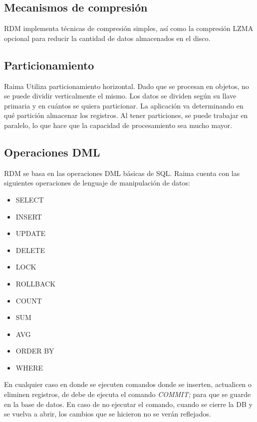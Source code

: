 \documentclass{acmart}
\begin{document}
\subsection{Mecanismos de compresión}
RDM implementa técnicas de compresión simples, así como la compresión LZMA opcional para reducir la cantidad de datos almacenados en el disco. \cite{Rover}
\subsection{Particionamiento}
Raima Utiliza particionamiento horizontal. Dado que se procesan en objetos, no se puede dividir verticalmente el mismo. Los datos se dividen según su llave primaria y en cuántos se quiera particionar. La aplicación va determinando en qué partición almacenar los registros. Al tener particiones, se puede trabajar en paralelo, lo que hace que la capacidad de procesamiento sea mucho mayor.
\subsection{Operaciones DML}
RDM se basa en las operaciones DML básicas de SQL.
Raima cuenta con las siguientes operaciones de lenguaje de manipulación de datos:\par
\begin{itemize}
    \item SELECT\par
	\item INSERT\par
	\item UPDATE\par
	\item DELETE\par
	\item LOCK\par
	\item ROLLBACK\par
	\item COUNT\par
	\item SUM\par
	\item AVG\par
	\item ORDER BY\par
	\item WHERE\par
\end{itemize}

En cualquier caso en donde se ejecuten comandos donde se inserten, actualicen o eliminen registros, de debe de ejecuta el comando \textit{COMMIT;} para que se guarde en la base de datos. En caso de no ejecutar el comando, cuando se cierre la DB y se vuelva a abrir, los cambios que se hicieron no se verán reflejados. \cite{Rsql, Rsort}
\end{document}
